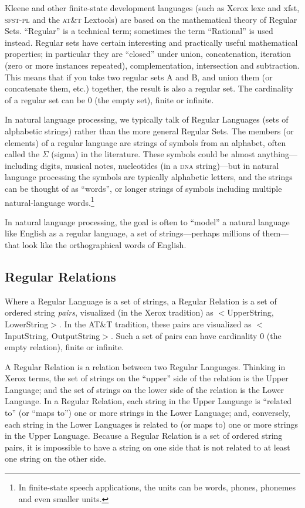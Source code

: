 \documentclass[letterpaper,12pt]{article}
\providecommand{\acro}{}\renewcommand{\acro}{\textsc}
\begin{document}
Kleene and other finite-state development languages (such as Xerox lexc
and xfst, \acro{sfst-pl} and the \acro{at\&t} Lextools) are based on the
mathematical theory of Regular Sets.  ``Regular'' is a technical term;
sometimes the term ``Rational'' is used instead.  Regular sets have
certain interesting and practically useful mathematical properties; in
particular they are ``closed'' under union, concatenation, iteration
(zero or more instances repeated), complementation, intersection and
subtraction.  This means that if you take two regular sets A and B, and
union them (or concatenate them, etc.) together, the result is also a
regular set.  The cardinality of a regular set can be 0 (the empty set),
finite or infinite.

In natural language processing, we typically talk of Regular Languages
(sets of alphabetic strings) rather than the more general Regular Sets.
The members (or elements) of a regular language are strings of symbols
from an alphabet, often called the $\Sigma$ (sigma) in the literature.
These symbols could be almost anything---including digits, musical notes,
nucleotides (in a \acro{dna} string)---but in natural language processing
the symbols are typically alphabetic letters, and the strings can be
thought of as ``words'', or longer strings of symbols including multiple
natural-language words.\footnote{In finite-state speech applications, the
units can be words, phones, phonemes and even smaller units.} 

In natural language processing, the goal is often to ``model'' a natural
language like English as a regular language, a set of strings---perhaps
millions of them---that look like the orthographical words of English.

\subsection{Regular Relations}

Where a Regular Language is a set of strings, a Regular Relation is a set
of ordered string \emph{pairs},
visualized (in the Xerox tradition) as $<$UpperString, LowerString$>$.  In the AT\&T tradition, these pairs
are visualized as $<$InputString, OutputString$>$.  Such a set of pairs 
can have cardinality 0 (the empty
relation), finite or infinite.

A Regular Relation is a relation between two Regular Languages.  Thinking
in Xerox terms, the set of strings on the ``upper'' side of the relation
is the Upper Language; and the set of strings on the lower side of the
relation is the Lower Language.  In a Regular Relation, each string in
the Upper Language is ``related to'' (or ``maps to'') one or more strings in the Lower
Language; and, conversely,
each string in the Lower Languages is related to (or maps to) one or
more strings in the Upper Language.  Because a Regular Relation is a set
of ordered string pairs, it is impossible to have a string on one side
that is not related to at least one string on the other side.
\end{document}
